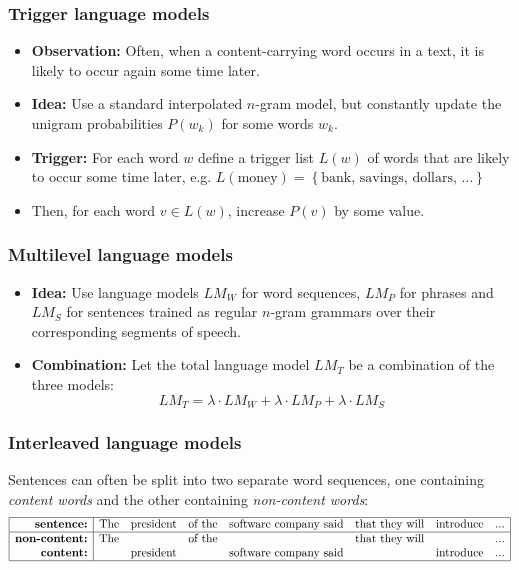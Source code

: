 \documentclass[11pt]{article}
\begin{document}
\subsubsection{Trigger language models}
\begin{itemize}
    \item \textbf{Observation:} Often, when a content-carrying word occurs in a text, it is likely to occur again some time later.
    \item \textbf{Idea:} Use a standard interpolated $n$-gram model, but constantly update the unigram probabilities $P(w_k)$ for some words $w_k$.
    \item \textbf{Trigger:} For each word $w$ define a trigger list $L(w)$ of words that are likely to occur some time later, e.g. $L(\mbox{money}) = \left\{\mbox{bank}, \, \mbox{savings}, \, \mbox{dollars}, \, \ldots \right\}$
    \item Then, for each word $v \in L(w)$, increase $P(v)$ by some value.
\end{itemize}

\subsubsection{Multilevel language models}
\begin{itemize}
    \item \textbf{Idea:} Use language models $LM_W$ for word sequences, $LM_P$ for phrases and $LM_S$ for sentences trained as regular $n$-gram grammars over their corresponding segments of speech.
    \item \textbf{Combination:} Let the total language model $LM_T$ be a combination of the three models:
        \[
        LM_T = \lambda \cdot LM_W + \lambda \cdot LM_P + \lambda \cdot LM_S
        \]
\end{itemize}

\subsubsection{Interleaved language models}
Sentences can often be split into two separate word sequences, one containing \textit{content words} and the other containing \textit{non-content words}:
\[
\begin{array}{|r|ccccccc|}
    \hline
    \mbox{\textbf{sentence:}} & \mbox{The} & \mbox{president} & \mbox{of the} & \mbox{software company said} & \mbox{that they will} & \mbox{introduce} & \mbox{...} \\
    \hline
    \mbox{\textbf{non-content:}} & \mbox{The} & & \mbox{of the} & & \mbox{that they will} & & \mbox{...} \\
    \mbox{\textbf{content:}} & & \mbox{president} & & \mbox{software company said} & & \mbox{introduce} & \mbox{...} \\
    \hline
\end{array}
\]
\end{document}

